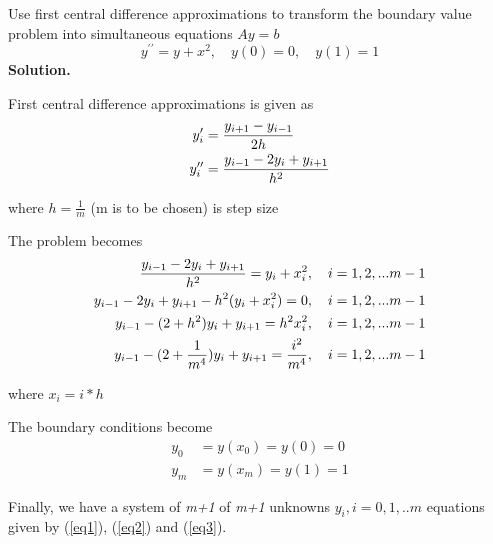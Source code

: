 \begin{exercise}{5} %
Use first central difference approximations to transform the boundary value problem into simultaneous equations $Ay = b$
$$y^{\prime\prime}=y+x^2, \quad y(0)=0, \quad y(1)=1$$
\textbf{Solution.}

First central difference approximations is given as
\begin{align}
y^\prime_i &= \frac{y_{i+1}-y_{i-1}}{2h} \notag \\
y^{\prime\prime}_i &= \frac{y_{i-1}-2y_i+y_{i+1}}{h^2} \notag
\end{align}

where $h=\frac{1}{m}$ (m is to be chosen) is step size

The problem becomes
\begin{align}
\frac{y_{i-1}-2y_i+y_{i+1}}{h^2} = y_i+x_i^2,\quad i=1,2,...m-1\notag \\
y_{i-1}-2y_i+y_{i+1} - {h^2}(y_i+x_i^2) = 0, \quad i=1,2,...m-1\notag \\
y_{i-1} - (2+h^2)y_i+y_{i+1} = h^2x_i^2 , \quad i=1,2,...m-1 \label{eq1}  \notag \\
y_{i-1} - (2+\frac{1}{m^4})y_i+y_{i+1} = \frac{i^2}{m^4} , \quad i=1,2,...m-1 \end{align}

where $x_i = i*h$

The boundary conditions become
\begin{align}
y_0 &= y(x_0)= y(0) = 0 \label{eq2} \\ 
y_m &= y(x_m)= y(1) = 1 \label{eq3} 
\end{align}

Finally, we have a system of \textit{m+1} of \textit{m+1} unknowns $y_i, i=0,1,..m$ equations given by (\ref{eq1}), (\ref{eq2}) and (\ref{eq3}).

\end{exercise}


